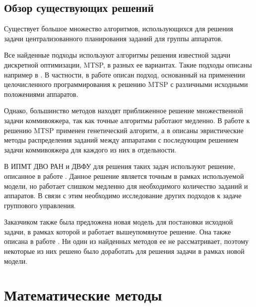 \documentclass[a4paper,14pt,russian]{article}
\begin{document}
\subsection{Обзор существующих решений}


Существует большое множество алгоритмов, использующихся для решения задачи централизованного планирования заданий для группы аппаратов.

Все найденные подходы используют алгоритмы решения известной задачи дискретной оптимизации, MTSP, в разных ее вариантах. Такие подходы описаны например в \cite{bektas2006multiple}. В частности, в работе \cite{binaryprog} описан подход, основанный на применении целочисленного программирования к решению MTSP с различными исходными положениями аппаратов.

Однако, большинство методов находят приближенное решение множественной задачи коммивояжера, так как точные алгоритмы работают медленно. В работе \cite{kiraly2010novel} к решению MTSP применен генетический алгоритм, а в \cite{na2007heurisic} описаны эвристические методы распределения заданий между аппаратами с последующим решением задачи коммивояжера для каждого из них в отдельности.


В ИПМТ ДВО РАН и ДВФУ для решения таких задач используют решение, описанное в работе \cite{tuphanov}. Данное решение является точным в рамках используемой модели, но работает слишком медленно для необходимого количество заданий и аппаратов. В связи с этим необходимо исследование других подходов к задаче группового управления.

Заказчиком также была предложена новая модель для постановки исходной задачи, в рамках которой и работает вышеупомянутое решение. Она также описана в работе \cite{tuphanov}. Ни один из найденных методов ее не рассматривает, поэтому некоторые из них решено было доработать для решения задачи в рамках новой модели.

\section{Математические методы}
\end{document}
